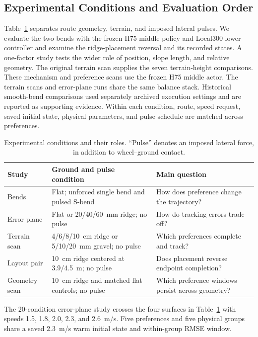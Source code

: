 \documentclass[journal]{IEEEtran}
\begin{document}
\subsection{Experimental Conditions and Evaluation Order}
Table~\ref{tab:experiments} separates route geometry, terrain, and imposed lateral pulses. We evaluate the two bends with the frozen H75 middle policy and Local300 lower controller and examine the ridge-placement reversal and its recorded states. A one-factor study tests the wider role of position, slope length, and relative geometry. The original terrain scan supplies the seven terrain-height comparisons. These mechanism and preference scans use the frozen H75 middle actor. The terrain scans and error-plane runs share the same balance stack. Historical smooth-bend comparisons used separately archived execution settings and are reported as supporting evidence. Within each condition, route, speed request, saved initial state, physical parameters, and pulse schedule are matched across preferences.

\begin{table}[t]\centering\footnotesize
\caption{Experimental conditions and their roles. ``Pulse'' denotes an imposed lateral force, in addition to wheel--ground contact.}\label{tab:experiments}
\begin{tabular}{@{}p{17mm}p{35mm}p{28mm}@{}}\toprule
Study & Ground and pulse condition & Main question\\\midrule
Bends & Flat; unforced single bend and pulsed S-bend & How does preference change the trajectory?\\
Error plane & Flat or 20/40/60~mm ridge; no pulse & How do tracking errors trade off?\\
Terrain scan & 4/6/8/10~cm ridge or 5/10/20~mm gravel; no pulse & Which preferences complete and track?\\
Layout pair & 10~cm ridge centered at 3.9/4.5~m; no pulse & Does placement reverse endpoint completion?\\
Geometry scan & 10~cm ridge and matched flat controls; no pulse & Which preference windows persist across geometry?\\\bottomrule
\end{tabular}
\end{table}

The 20-condition error-plane study crosses the four surfaces in Table~\ref{tab:experiments} with speeds 1.5, 1.8, 2.0, 2.3, and 2.6~m/s. Five preferences and five physical groups share a saved 2.3~m/s warm initial state and within-group RMSE window.
\end{document}
